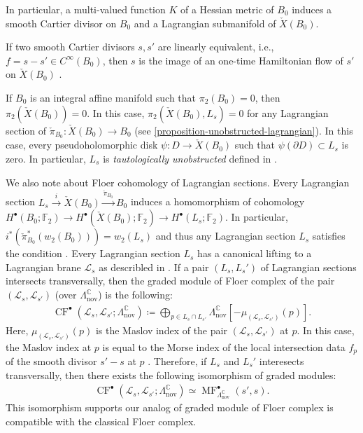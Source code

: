 \documentclass[a4paper,dvipdfmx,reqno,12pt]{amsart}
\theoremstyle{definition}
\newcommand{\deq}{\coloneqq}
\newcommand{\opn}[1]{\operatorname{#1}}
\newcommand{\xto}[1]{\xrightarrow{#1}}
\numberwithin{equation}{section}
\begin{document}
In particular, a multi-valued function $K$ of a Hessian 
metric of $B_0$ induces a smooth Cartier divisor on $B_0$
and a Lagrangian submanifold of $\check{X}(B_0)$.

If two smooth Cartier divisors $s,s'$ are linearly equivalent, 
i.e., $f=s-s'\in C^{\infty}(B_0)$, 
then $s$ is the image of an one-time Hamiltonian flow of $s'$
on $\check{X}(B_0)$
\cite[Exercise 6.65]{MR2567952}.

If $B_0$ is an integral affine manifold such 
that $\pi_2(B_0)=0$, then $\pi_2(\check{X}(B_0))=0$.
In this case, $\pi_2(\check{X}(B_0),L_s)=0$ for 
any Lagrangian section of 
$\check{\pi}_{B_0}\colon \check{X}(B_0)\to B_0$
(see \cref{proposition-unobstructed-lagrangian}).
In this case, every 
pseudoholomorphic disk 
$\psi\colon D\to \check{X}(B_0)$ such that 
$\psi(\partial D)\subset L_s$ is zero.
In particular, $L_s$ is 
\emph{tautologically unobstructed} defined in
\cite[(2.50)]{MR3656481}.

We also note about Floer cohomology of 
Lagrangian sections.
Every Lagrangian section
$L_s\xto{i} \check{X}(B_0)\xto{\check{\pi}_{B_0}}  B_0$
induces a homomorphism of 
cohomology 
$H^{\bullet}(B_0;\mathbb{F}_2)\to 
H^{\bullet}(\check{X}(B_0);\mathbb{F}_2)
\to 
H^{\bullet}(L_s;\mathbb{F}_2)$.
In particular, 
$i^{*}(\check{\pi}_{B_0}^{*}(w_2(B_0)))=w_2(L_s)$ and 
thus any Lagrangian section $L_s$ satisfies the 
condition \cite[(2.54)]{MR3656481}.
Every Lagrangian section $L_s$ has 
a canonical lifting to a Lagrangian 
brane $\mathscr{L}_s$ as describled in 
\cite[5.2]{MR1882331}.
If a pair $(L_s,L_s')$ of Lagrangian sections 
intersects transversally, then the graded 
module of Floer complex of the pair
$(\mathscr{L}_s,\mathscr{L}_{s'})$
(over $\Lambda_{\opn{nov}}^{\mathbb{C}}$) 
is the following:
\begin{align}
\opn{CF}^{\bullet}(\mathscr{L}_s,\mathscr{L}_{s'};
\Lambda_{\opn{nov}}^{\mathbb{C}})
\deq \bigoplus_{p\in L_s\cap L_{s'}}
\Lambda_{\opn{nov}}^{\mathbb{C}}
[-\mu_{(\mathscr{L}_s,\mathscr{L}_{s'})}(p)].
\end{align}
Here, $\mu_{(\mathscr{L}_s,\mathscr{L}_{s'})}(p)$ is 
the Maslov index of the pair 
$(\mathscr{L}_s,\mathscr{L}_{s'})$ at $p$.
In this case, the Maslov index at $p$
is equal to the Morse index of the 
local intersection data $f_{p}$ of 
the smooth divisor $s'-s$ at $p$
\cite[Remark 13]{MR1882331}. Therefore, 
if $L_s$ and $L_s'$ interesects 
transversally, then there exists the following
isomorphism of graded modules:
\begin{align}
\opn{CF}^{\bullet}(\mathscr{L}_s,\mathscr{L}_{s'};
\Lambda_{\opn{nov}}^{\mathbb{C}})
\simeq 
\opn{MF}^{\bullet}_{\Lambda_{\opn{nov}}^{\mathbb{C}}}
(s',s).
\end{align}
This isomorphism supports our analog of graded module
of Floer complex is compatible with the classical 
Floer complex.
\end{document}
